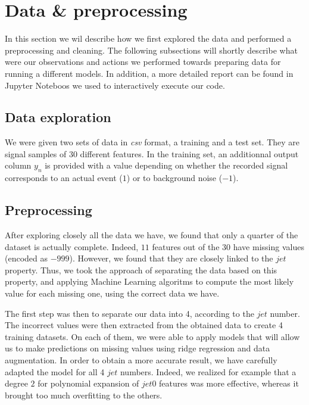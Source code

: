 \documentclass[10pt,conference,compsocconf]{IEEEtran}
\begin{document}
\section{\textbf{Data \& preprocessing}}

In this section we wil describe how we first explored the data and performed a preprocessing and cleaning. The following subsections will shortly describe what were our observations and actions we performed towards preparing data for running a different models. In addition, a more detailed report can be found in Jupyter Noteboos we used to interactively execute our code.

\subsection{Data exploration}

We were given two sets of data in \textit{csv} format, a training and a test set. They are signal samples of $30$ different features. In the training set, an additionnal output column $y_n$ is provided with a value depending on whether the recorded signal corresponds to an actual event ($1$) or to background noise ($-1$).

\subsection{Preprocessing}

After exploring closely all the data we have, we found that only a quarter of the dataset is actually complete. Indeed, $11$ features out of the $30$ have missing values (encoded as $-999$). However, we found that they are closely linked to the $jet$ property. Thus, we took the approach of separating the data based on this property, and applying Machine Learning algoritms to compute the most likely value for each missing one, using the correct data we have.

The first step was then to separate our data into 4, according to the $jet$ number. The incorrect values were then extracted from the obtained data to create 4 training datasets. On each of them, we were able to apply models that will allow us to make predictions on missing values using ridge regression and data augmentation. In order to obtain a more accurate result, we have carefully adapted the model for all 4 $jet$ numbers. Indeed, we realized for example that a degree $2$ for polynomial expansion of $jet0$ features was more effective, whereas it brought too much overfitting to the others.
\end{document}
